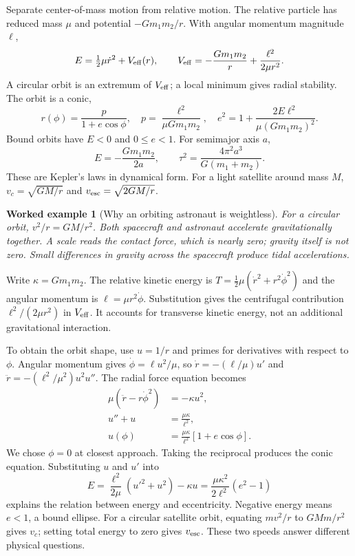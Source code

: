 \documentclass[11pt,oneside]{book}
\theoremstyle{reviewstyle}
\newtheorem{example}{Worked example}[chapter]
\begin{document}
Separate center-of-mass motion from relative motion. The relative particle has reduced mass $\mu$ and potential $-Gm_1m_2/r$. With angular momentum magnitude $\ell$,
\begin{equation}
E=\tfrac12\mu\dot r^2+V_{\rm eff}(r),\qquad
V_{\rm eff}=-\frac{Gm_1m_2}{r}+\frac{\ell^2}{2\mu r^2}.
\end{equation}
A circular orbit is an extremum of $V_{\rm eff}$; a local minimum gives radial stability. The orbit is a conic,
\begin{equation}
r(\phi)=\frac{p}{1+e\cos\phi},\quad
p=\frac{\ell^2}{\mu Gm_1m_2},\quad
e^2=1+\frac{2E\ell^2}{\mu(Gm_1m_2)^2}.
\end{equation}
Bound orbits have $E<0$ and $0\leq e<1$. For semimajor axis $a$,
\begin{equation}
E=-\frac{Gm_1m_2}{2a},\qquad
\tau^2=\frac{4\pi^2a^3}{G(m_1+m_2)}.
\end{equation}
These are Kepler's laws in dynamical form. For a light satellite around mass $M$,
$v_c=\sqrt{GM/r}$ and $v_{\rm esc}=\sqrt{2GM/r}$.
\begin{example}[Why an orbiting astronaut is weightless]
For a circular orbit, $v^2/r=GM/r^2$. Both spacecraft and astronaut accelerate gravitationally together. A scale reads the contact force, which is nearly zero; gravity itself is not zero. Small differences in gravity across the spacecraft produce tidal accelerations.
\end{example}

Write $\kappa=Gm_1m_2$. The relative kinetic energy is $T=\tfrac12\mu(\dot r^2+r^2\dot\phi^2)$ and the angular momentum is $\ell=\mu r^2\dot\phi$. Substitution gives the centrifugal contribution $\ell^2/(2\mu r^2)$ in $V_{\rm eff}$. It accounts for transverse kinetic energy, not an additional gravitational interaction.

To obtain the orbit shape, use $u=1/r$ and primes for derivatives with respect to $\phi$. Angular momentum gives $\dot\phi=\ell u^2/\mu$, so $\dot r=-(\ell/\mu)u'$ and $\ddot r=-(\ell^2/\mu^2)u^2u''$. The radial force equation becomes
\begin{align}
\mu(\ddot r-r\dot\phi^2)&=-\kappa u^2,\\
u''+u&=\frac{\mu\kappa}{\ell^2},\\
u(\phi)&=\frac{\mu\kappa}{\ell^2}[1+e\cos\phi].
\end{align}
We chose $\phi=0$ at closest approach. Taking the reciprocal produces the conic equation. Substituting $u$ and $u'$ into
\begin{equation}
E=\frac{\ell^2}{2\mu}(u'^2+u^2)-\kappa u
=\frac{\mu\kappa^2}{2\ell^2}(e^2-1)
\end{equation}
explains the relation between energy and eccentricity. Negative energy means $e<1$, a bound ellipse. For a circular satellite orbit, equating $mv^2/r$ to $GMm/r^2$ gives $v_c$; setting total energy to zero gives $v_{\rm esc}$. These two speeds answer different physical questions.
\end{document}
